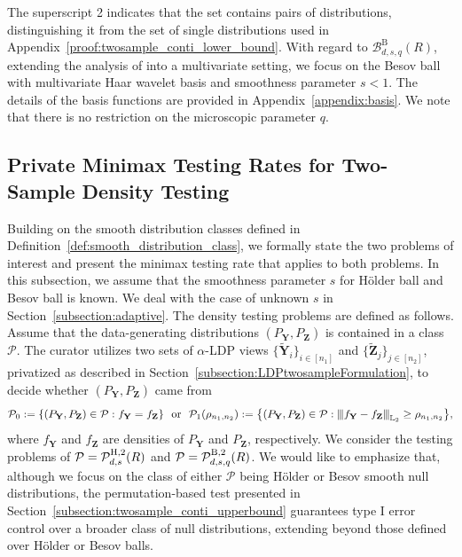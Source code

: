 \documentclass[twoside,11pt]{article}
\newcommand{\distClassGeneric}{\mathcal{P}}
\newcommand{\rhoTwosample}{\rho_{\sampleSize_1, \sampleSize_2}}
\newcommand{\Ell}{\mathbb{L}}
\newcommand{\normEllp}[3]{
	\vertiii{#1}_{\Ell_{#2}}^{#3}
}
\newcommand{\vertiii}[1]{
	{\left\vert\kern-0.25ex\left\vert\kern-0.25ex\left\vert #1 
		\right\vert\kern-0.25ex\right\vert\kern-0.25ex\right\vert}
}%
\newcommand{\rvTwo}{Y}
\newcommand{\vectorize}[1]{\mathbf{#1}}
\newcommand{\rvZ}{Z}
\newcommand{\rVecZ}{\vectorize{\rvZ}}
\newcommand{\rVecZPriv}{\tilde{\rVecZ}} %
\newcommand{\sampleIndexOne}{i}
\newcommand{\sampleIndexTwo}{j}
\newcommand{\sampleSets}[3]{\{{#1}_{#2}\}_{#2 \in [#3]}}
\newcommand{\dimDensity}{d} %
\newcommand{\sampleSize}{n}
\newcommand{\smoothness}{s}
\newcommand{\ballRadius}{R}
\newcommand{\privacyParameter}{\alpha} %
\newcommand{\besovParamMicroscope}{q}
\newcommand{\ballDistn}{\mathcal{B}}
\newcommand{\besovBall}[2]{\ballDistn_{\dimDensity,\smoothness, #2}^{\mathrm{B}}(\ballRadius)}
\newcommand{\pBesovTs}{ %
	\distClassGeneric_{%
		\dimDensity, \smoothness, \besovParamMicroscope
	}^{%
		\mathrm{B,2}
	}
	(\ballRadius)
}
\newcommand{\pHolderTs}{ %
	\distClassGeneric_{%
		\dimDensity, \smoothness
	}^{%
		\mathrm{H,2}
	}
	(\ballRadius)
}
\begin{document}
The superscript 2 indicates that the set contains pairs of distributions, distinguishing it from the set of single distributions used in Appendix~\ref{proof:twosample_conti_lower_bound}.
With regard to $\besovBall{2}{q}$, extending the analysis of \citep{Lam-Weil2021MinimaxConstraint} into a multivariate setting, we focus on the Besov ball with multivariate Haar wavelet basis and smoothness parameter $\smoothness < 1$.
The details of the basis functions are provided in Appendix~\ref{appendix:basis}.
We note that there is no restriction on the microscopic parameter $q$.
%
\subsection{Private Minimax Testing Rates for Two-Sample Density Testing}\label{subsection:twosample_conti_rates}
Building on the smooth distribution classes defined in Definition~\ref{def:smooth_distribution_class}, we formally state the two problems of interest and present the minimax testing rate that applies to both problems. In this subsection, we assume that the smoothness parameter $s$ for H\"{o}lder ball and Besov ball is known. We deal with the case of unknown $s$ in Section~\ref{subsection:adaptive}. %
The density testing problems  are defined  as follows.
Assume that the data-generating distributions $(P_{\vectorize{Y}}, P_{\vectorize{Z}})$ is contained in a class $\distClassGeneric$.
The curator utilizes two sets of $\privacyParameter$-LDP views $\sampleSets{\tilde{\vectorize{\rvTwo}}}{\sampleIndexOne}{\sampleSize_1}$ and $\sampleSets{\rVecZPriv}{\sampleIndexTwo}{\sampleSize_2}$, privatized as described in Section~\ref{subsection:LDPtwosampleFormulation},  to decide whether $(P_{\vectorize{Y}}, P_{\vectorize{Z}})$ came from
\begin{equation}\label{hypothesis:twosample_Holder_alt} 
	\distClassGeneric_0
	:=
	\{
	(P_{\vectorize{Y}}, P_{\vectorize{Z}})
	\in
	\distClassGeneric
	:
	f_{\vectorize{Y}}
	= f_{\vectorize{Z}} \}~\text{ or }
	~
	\distClassGeneric_1
	(
	\rho_{n_1,n_2}
	)
	:=
	\bigl\{
	(P_{\vectorize{Y}}, P_{\vectorize{Z}}) \in \distClassGeneric:
	\normEllp{f_{\vectorize{Y}} - f_{\vectorize{Z}}}{2}{} \geq \rhoTwosample
	\bigr\},
\end{equation}
where $f_{\vectorize{Y}}$ and $f_{\vectorize{Z}}$ are densities of $P_{\vectorize{Y}}$ and $P_{\vectorize{Z}}$, respectively.
We consider the testing problems of $\distClassGeneric=\pHolderTs$ and $\distClassGeneric=\pBesovTs$.
We would like to emphasize that, although we focus on the class of either $\distClassGeneric$ being H\"{o}lder or Besov smooth null distributions, the permutation-based test presented in Section~\ref{subsection:twosample_conti_upperbound} guarantees type I error control over a broader class of null distributions, extending beyond those defined over H\"{o}lder or Besov balls.
\end{document}
